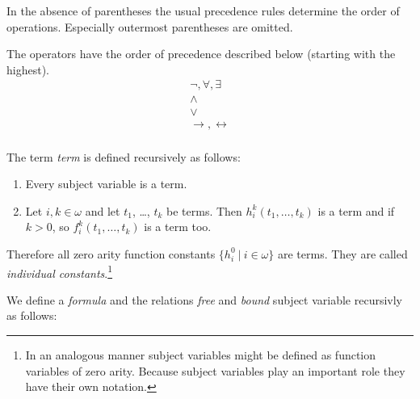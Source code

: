 \documentclass[a4paper,german,10pt,twoside]{book}
\theoremstyle{definition}
\theoremstyle{remark}
\begin{document}
In the absence of parentheses the usual precedence rules determine the order of operations. Especially outermost parentheses are omitted.

\par
The operators have the order of precedence described below (starting with the highest).
$$
\begin{array}{c}
  \neg, \forall, \exists  \\
  \land \\
  \lor \\
  \rightarrow, \leftrightarrow \\
\end{array}
$$

\par
The term \emph{term} is defined recursively as follows:

\begin{enumerate}
\item Every subject variable is a term. 
\item Let $i, k \in \omega$ and let $t_1$, \ldots, $t_k$ be terms. Then $h^k_i(t_1, \ldots, t_k)$ is a term and if $k > 0$, so $f^k_i(t_1, \ldots, t_k)$ is a term too.
\end{enumerate}

Therefore all zero arity function constants $\{h^0_i~|~i \in \omega\}$ are terms. They are called \emph{individual constants}.\footnote{In an analogous manner subject variables might be defined as function variables of zero arity. Because subject variables play an important role they have their own notation.}

\par
We define a \emph{formula} and the relations \emph{free} and \emph{bound} subject variable recursivly as follows:
\end{document}
